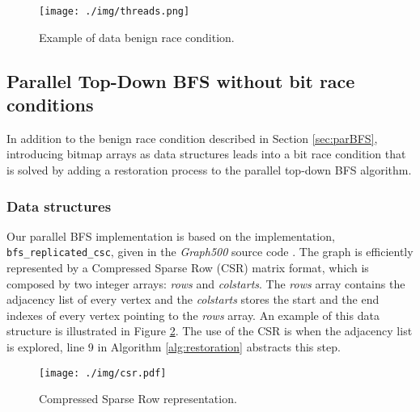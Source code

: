 \documentclass{sig-alternate-05-2015}
\begin{document}
\begin{figure}[h!]
\centering
\texttt{[image: ./img/threads.png]}
\caption{Example of data benign race condition.}
\label{fig:race2}
\vspace{-3mm}
\end{figure}














\subsection{Parallel Top-Down BFS without bit race conditions}
\label{sub:bitrace}
In addition to the benign race condition described in Section \ref{sec:parBFS}, introducing bitmap arrays as data structures leads into a bit race condition that is solved by adding a restoration process to the parallel top-down BFS algorithm. 
\subsubsection{Data structures}





Our parallel BFS implementation is based on the implementation,
\texttt{bfs\_replicated\_csc}, given in the \textit{Graph500} source
code \cite{graph500:GIT}. The graph is efficiently represented by a
Compressed Sparse Row (CSR) matrix format, which is composed by two
integer arrays: \textit{rows} and \textit{colstarts}. The
\textit{rows} array contains the adjacency list of every vertex and
the \textit{colstarts} stores the start and the end indexes of every
vertex pointing to the \textit{rows} array. An example of this data
structure is illustrated in Figure \ref{fig:csr}. The use of the CSR is when the adjacency list is explored, line 9 in Algorithm \ref{alg:restoration} abstracts this step.

\begin{figure}
\centering
\texttt{[image: ./img/csr.pdf]}
\caption{Compressed Sparse Row representation.}
\label{fig:csr}
\vspace{-3mm}
\end{figure}
\end{document}
